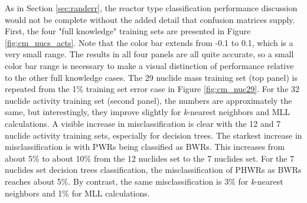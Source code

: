 As in Section \ref{sec:randerr}, the reactor type classification performance
discussion would not be complete without the added detail that confusion
matrices supply. First, the four "full knowledge" training sets are presented
in Figure \ref{fig:cm_nucs_acts}.  Note that the color bar extends from -0.1 to
0.1, which is a very small range.  The results in all four panels are all quite
accurate, so a small color bar range is necessary to make a visual distinction
of performance relative to the other full knowledge cases.  The 29 nuclide mass
training set (top panel) is repeated from the 1\% training set error case in
Figure \ref{fig:cm_nuc29}.  For the 32 nuclide activity training set (second
panel), the numbers are approximately the same, but interestingly, they improve
slightly for \textit{k}-nearest neighbors and \gls{MLL} calculations.  A
visible increase in misclassification is clear with the 12 and 7 nuclide
activity training sets, especially for decision trees. The starkest increase in
misclassification is with \gls{PWR}s being classified as \gls{BWR}s. This
increases from about 5\% to about 10\% from the 12 nuclides set to the 7
nuclides set. For the 7 nuclides set decision trees classification, the
misclassification of \gls{PHWR}s as \gls{BWR}s reaches about 5\%. By contrast,
the same misclassification is 3\% for \textit{k}-nearest neighbors and 1\% for
\gls{MLL} calculations. 

